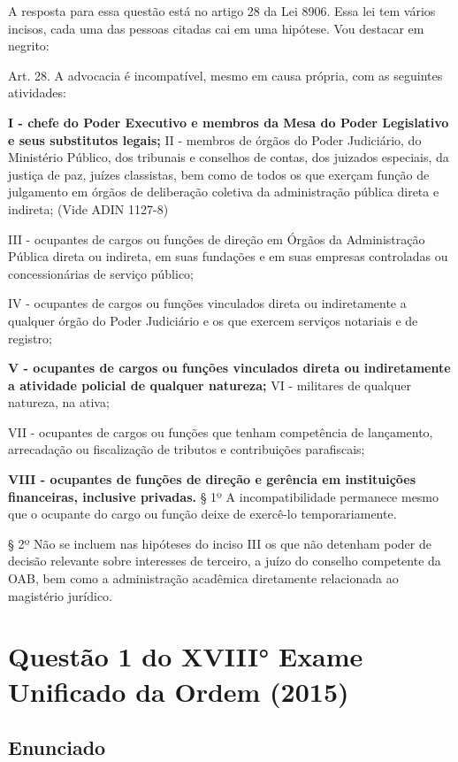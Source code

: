 \documentclass[12pt]{article}
\begin{document}
A resposta para essa questão está no artigo 28 da Lei 8906. Essa lei tem vários incisos, cada uma das pessoas citadas cai em uma hipótese. Vou destacar em negrito:

Art. 28. A advocacia é incompatível, mesmo em causa própria, com as seguintes atividades:

\textbf{I - chefe do Poder Executivo e membros da Mesa do Poder Legislativo e seus substitutos legais;
}
II - membros de órgãos do Poder Judiciário, do Ministério Público, dos tribunais e conselhos de contas, dos juizados especiais, da justiça de paz, juízes classistas, bem como de todos os que exerçam função de julgamento em órgãos de deliberação coletiva da administração pública direta e indireta;  (Vide ADIN 1127-8)

III - ocupantes de cargos ou funções de direção em Órgãos da Administração Pública direta ou indireta, em suas fundações e em suas empresas controladas ou concessionárias de serviço público;

IV - ocupantes de cargos ou funções vinculados direta ou indiretamente a qualquer órgão do Poder Judiciário e os que exercem serviços notariais e de registro;

\textbf{V - ocupantes de cargos ou funções vinculados direta ou indiretamente a atividade policial de qualquer natureza;
}
VI - militares de qualquer natureza, na ativa;

VII - ocupantes de cargos ou funções que tenham competência de lançamento, arrecadação ou fiscalização de tributos e contribuições parafiscais;

\textbf{VIII - ocupantes de funções de direção e gerência em instituições financeiras, inclusive privadas.
}
§ 1º A incompatibilidade permanece mesmo que o ocupante do cargo ou função deixe de exercê-lo temporariamente.

§ 2º Não se incluem nas hipóteses do inciso III os que não detenham poder de decisão relevante sobre interesses de terceiro, a juízo do conselho competente da OAB, bem como a administração acadêmica diretamente relacionada ao magistério jurídico.


\section{Questão 1 do XVIII° Exame Unificado da Ordem (2015) } 

\subsection{Enunciado} 
\end{document}
